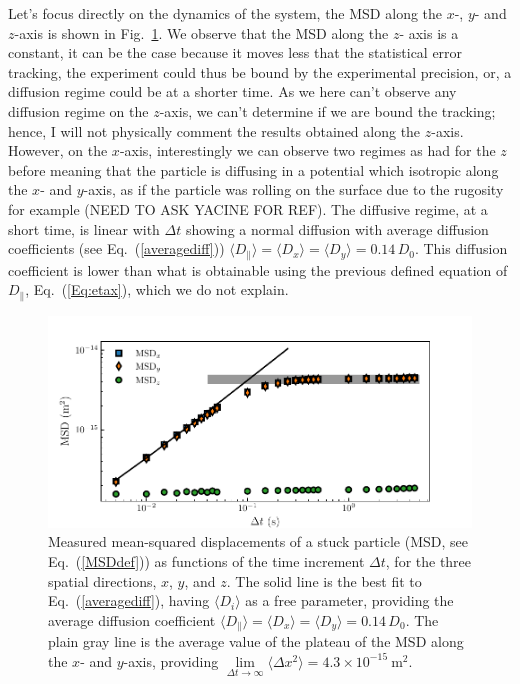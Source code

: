 Let's focus directly on the dynamics of the system, the \gls{MSD} along the $x$-, $y$- and $z$-axis is shown in Fig.~\ref{fig.MSD_stucked}. We observe that the \gls{MSD} along the $z$- axis is a constant, it can be the case because it moves less that the statistical error tracking, the experiment could thus be bound by the experimental precision, or, a diffusion regime could be at a shorter time. As we here can't observe any diffusion regime on the $z$-axis, we can't determine if we are bound the tracking; hence, I will not physically comment the results obtained along the $z$-axis. However, on the $x$-axis, interestingly we can observe two regimes as had for the $z$ before meaning that the particle is diffusing in a potential which isotropic along the $x$- and $y$-axis, as if the particle was rolling on the surface due to the rugosity for example (NEED TO ASK YACINE FOR REF). The diffusive regime, at a short time, is linear with $\Delta t$ showing a normal diffusion with  average diffusion coefficients (see Eq.~(\ref{averagediff}))  $\langle{D_\parallel}\rangle= \langle D_x\rangle=\langle D_y \rangle =0.14\,D_0$. This diffusion coefficient is lower than what is obtainable using the previous defined equation of $D_\parallel$, Eq.~(\ref{Eq:etax}), which we do not explain.



\begin{figure}[H]
	\centering
	\includegraphics{02_body/chapter4/images/stucked_particle/MSD_stucked.pdf}
	\caption{Measured mean-squared displacements of a stuck particle (MSD, see Eq.~(\ref{MSDdef})) as functions of the time increment $\Delta t$, for the three spatial directions, $x$, $y$, and $z$. The solid line is the best fit to Eq.~(\ref{averagediff}), having $\langle D_i \rangle$ as a free parameter,
		providing the average diffusion coefficient $\langle{D_\parallel}\rangle= \langle D_x\rangle=\langle D_y \rangle =0.14\,D_0$. The plain gray line is the average value of the plateau of the MSD along the $x$- and $y$-axis, providing $ \lim\limits_{\Delta t \rightarrow \infty }\langle \Delta x ^2 \rangle = 4.3 \times 10 ^{-15} ~ \mathrm{m^2}$.}
	\label{fig.MSD_stucked}
\end{figure}

